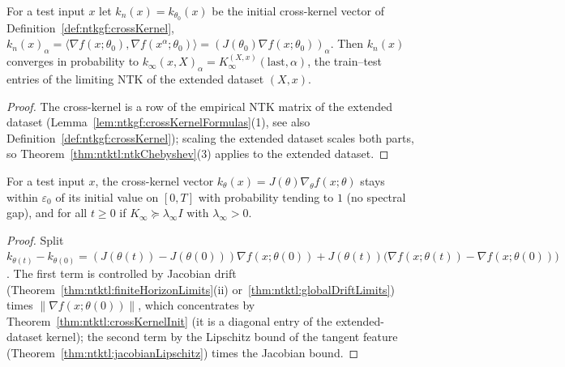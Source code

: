 \begin{theorem}\label{thm:ntktl:crossKernelInit}
  \leanok
For a test input $x$ let $k_n(x)=k_{\theta_0}(x)$ be the initial cross-kernel vector of Definition~\ref{def:ntkgf:crossKernel}, $k_n(x)_\alpha=\langle\nabla f(x;\theta_0),\nabla f(x^\alpha;\theta_0)\rangle=(J(\theta_0)\nabla f(x;\theta_0))_\alpha$. Then $k_n(x)$ converges in probability to $k_\infty(x,X)_\alpha=K_\infty^{(X,x)}(\text{last},\alpha)$, the train--test entries of the limiting NTK of the extended dataset $(X,x)$.
\end{theorem}

\begin{proof}
  \leanok
The cross-kernel is a row of the empirical NTK matrix of the extended dataset (Lemma~\ref{lem:ntkgf:crossKernelFormulas}(1), see also Definition~\ref{def:ntkgf:crossKernel}); scaling the extended dataset scales both parts, so Theorem~\ref{thm:ntktl:ntkChebyshev}(3) applies to the extended dataset.
\end{proof}

\begin{theorem}\label{thm:ntktl:crossKernelFreeze}
  \leanok
For a test input $x$, the cross-kernel vector $k_\theta(x)=J(\theta)\nabla_\theta f(x;\theta)$ stays within $\varepsilon_0$ of its initial value on $[0,T]$ with probability tending to $1$ (no spectral gap), and for all $t\ge0$ if $K_\infty\succeq\lambda_\infty I$ with $\lambda_\infty>0$.
\end{theorem}

\begin{proof}
  \leanok
Split $k_{\theta(t)}-k_{\theta(0)}=(J(\theta(t))-J(\theta(0)))\nabla f(x;\theta(0))+J(\theta(t))\bigl(\nabla f(x;\theta(t))-\nabla f(x;\theta(0))\bigr)$. The first term is controlled by Jacobian drift (Theorem~\ref{thm:ntktl:finiteHorizonLimits}(ii) or~\ref{thm:ntktl:globalDriftLimits}) times
$\|\nabla f(x;\theta(0))\|$, which concentrates by Theorem~\ref{thm:ntktl:crossKernelInit} (it is a diagonal entry of the extended-dataset kernel); the second term by the Lipschitz bound of the tangent feature (Theorem~\ref{thm:ntktl:jacobianLipschitz}) times the Jacobian bound.
\end{proof}

